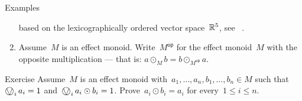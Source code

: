 \documentclass[b]{subfiles}
\begin{document}
\begin{parsec}
\begin{point}{Examples}
\begin{enumerate}
        based on the lexicographically ordered vector space~$\mathbb{R}^5$,
        see ~\cite[Cor.~51]{basmsc}.
\item Assume~$M$ is an effect monoid.
    Write~$M^{\mathsf{op}}$
        for the effect monoid~$M$ with the opposite multiplication
            --- that is: $a \odot_M b = b \odot_{M^\mathsf{op}} a$.
\end{enumerate}
\end{point}
\begin{point}{Exercise}%
Assume~$M$ is an effect monoid
with~$a_1, \ldots, a_n, b_1, \ldots, b_n \in M$
such that~$\bigovee_i a_i = 1$
and~$\bigovee_i a_i \odot b_i = 1$.
Prove~$a_i \odot b_i = a_i$ for every~$1 \leq i \leq n$.
\end{point}
\end{parsec}
\end{document}
